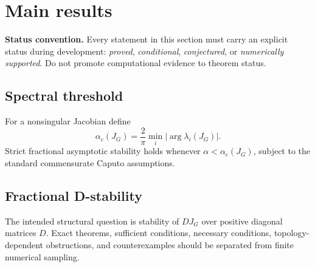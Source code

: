 \section{Main results}
\textbf{Status convention.} Every statement in this section must carry an explicit status during development: \emph{proved}, \emph{conditional}, \emph{conjectured}, or \emph{numerically supported}. Do not promote computational evidence to theorem status.

\subsection{Spectral threshold}
For a nonsingular Jacobian define
\begin{equation}
\alpha_c(J_G)=\frac{2}{\pi}\min_i |\arg\lambda_i(J_G)|.
\end{equation}
Strict fractional asymptotic stability holds whenever $\alpha<\alpha_c(J_G)$, subject to the standard commensurate Caputo assumptions.

\subsection{Fractional D-stability}
The intended structural question is stability of $D J_G$ over positive diagonal matrices $D$. Exact theorems, sufficient conditions, necessary conditions, topology-dependent obstructions, and counterexamples should be separated from finite numerical sampling.
